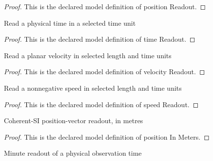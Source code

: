\begin{proof}
  This is the declared model definition of position Readout.
\end{proof}
\begin{definition}
  \label{def:physics:phyx-mini-0737:phyxminiproblems-problemphyxmini0737-timereadout}
  Read a physical time in a selected time unit
\end{definition}
\begin{proof}
  This is the declared model definition of time Readout.
\end{proof}
\begin{definition}
  \label{def:physics:phyx-mini-0737:phyxminiproblems-problemphyxmini0737-velocityreadout}
  Read a planar velocity in selected length and time units
\end{definition}
\begin{proof}
  This is the declared model definition of velocity Readout.
\end{proof}
\begin{definition}
  \label{def:physics:phyx-mini-0737:phyxminiproblems-problemphyxmini0737-speedreadout}
  Read a nonnegative speed in selected length and time units
\end{definition}
\begin{proof}
  This is the declared model definition of speed Readout.
\end{proof}
\begin{definition}
  \label{def:physics:phyx-mini-0737:phyxminiproblems-problemphyxmini0737-positioninmeters}
  Coherent-SI position-vector readout, in metres
\end{definition}
\begin{proof}
  This is the declared model definition of position In Meters.
\end{proof}
\begin{definition}
  \label{def:physics:phyx-mini-0737:phyxminiproblems-problemphyxmini0737-timeinminutes}
  Minute readout of a physical observation time
\end{definition}
